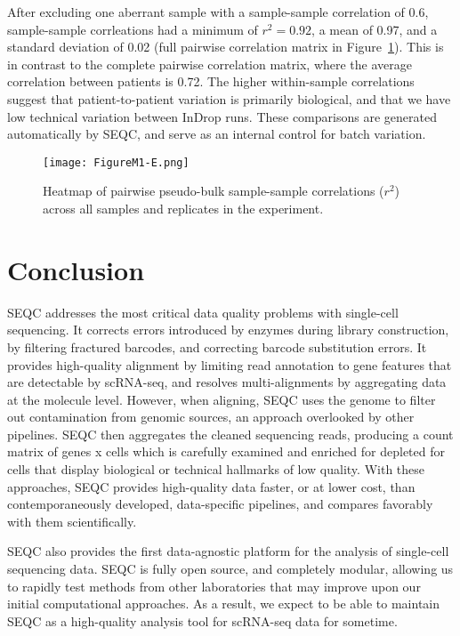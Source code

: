 After excluding one aberrant sample with a sample-sample correlation of 0.6, sample-sample corrleations had a minimum of $r^2=0.92$, a mean of 0.97, and a standard deviation of 0.02 (full pairwise correlation matrix in Figure~\ref{fig:m1e}). %
This is in contrast to the complete pairwise correlation matrix, where the average correlation between patients is 0.72. 
The higher within-sample correlations suggest that patient-to-patient variation is primarily biological, and that we have low technical variation between InDrop runs. 
These comparisons are generated automatically by SEQC, and serve as an internal control for batch variation.

\begin{figure}
\centering
\texttt{[image: FigureM1-E.png]}
\caption{Heatmap of pairwise pseudo-bulk sample-sample correlations ($r^2$) across all samples
and replicates in the experiment.
}
\label{fig:m1e}
\end{figure}

\section{Conclusion}

SEQC addresses the most critical data quality problems with single-cell sequencing. 
It corrects errors introduced by enzymes during library construction, by filtering fractured barcodes, and correcting barcode substitution errors. 
It provides high-quality alignment by limiting read annotation to gene features that are detectable by scRNA-seq, and resolves multi-alignments by aggregating data at the molecule level.  
However, when aligning, SEQC uses the genome to filter out contamination from genomic sources, an approach overlooked by other pipelines. 
SEQC then aggregates the cleaned sequencing reads, producing a count matrix of genes x cells which is carefully examined and enriched for depleted for cells that display biological or technical hallmarks of low quality. 
With these approaches, SEQC provides high-quality data faster, or at lower cost, than contemporaneously developed, data-specific pipelines, and compares favorably with them scientifically. 

SEQC also provides the first data-agnostic platform for the analysis of single-cell sequencing data.
SEQC is fully open source, and completely modular, allowing us to rapidly test methods from other laboratories that may improve upon our initial computational approaches. 
As a result, we expect to be able to maintain SEQC as a high-quality analysis tool for scRNA-seq data for sometime. 

